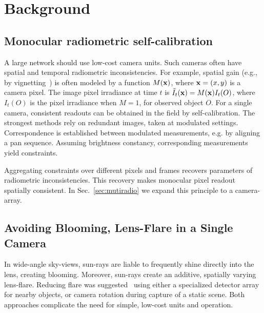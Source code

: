 \documentclass[runningheads]{llncs}
\begin{document}
\section{Background}
\label{sec:theory}


\subsection{Monocular radiometric self-calibration}
\label{sec:Signelradio}

A large network should use low-cost camera units. Such cameras often have spatial and temporal radiometric inconsistencies. For example, spatial gain (e.g., by vignetting~\cite{LitvinovCVPR05,Kang2000}) is often modeled by a function $M({\bf x})$, where \mbox{${\bf x}=(x,y)$} is a camera pixel. The image pixel irradiance at time $t$ is
\mbox{$ \tilde{I}_t({\bf x}) = M({\bf x})I_t(O)$}, where $I_t(O)$ is the pixel irradiance when $M=1$, for observed object $O$. For a single camera, consistent readouts can be obtained in the field by self-calibration. The strongest methods rely on redundant images, taken at modulated settings.
Correspondence is established between modulated measurements, e.g. by aligning a pan sequence. Assuming brightness constancy, corresponding measurements yield constraints.

Aggregating constraints over different pixels and frames recovers parameters of radiometric inconsistencies. This recovery makes monocular pixel readout spatially consistent. In Sec.~\ref{sec:mutiradio} we expand this principle to a camera-array.



\subsection{Avoiding Blooming, Lens-Flare in a Single Camera}
\label{sec:Signelflare}

In wide-angle sky-views, sun-rays are liable to frequently shine directly into the lens, creating blooming. Moreover, sun-rays create an additive, spatially varying lens-flare. Reducing flare was suggested~\cite{Koreban2009,Raskar2008,Talvala2007,Rouf2011} using either a specialized detector array for nearby objects, or camera rotation during capture of a static scene. Both approaches complicate the need for simple, low-cost units and operation.
\end{document}

